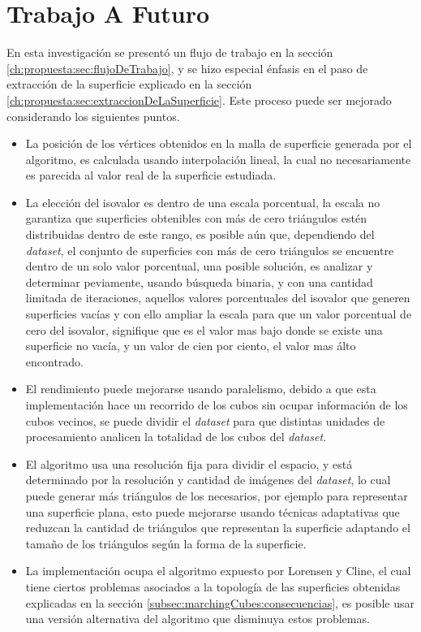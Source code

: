 \chapter{Trabajo A Futuro}
\label{ch:trabajoafuturo}

En esta investigación se presentó un flujo de trabajo en la sección \ref{ch:propuesta:sec:flujoDeTrabajo}, y se hizo especial énfasis en el paso de extracción de la superficie explicado en la sección \ref{ch:propuesta:sec:extraccionDeLaSuperficie}. Este proceso puede ser mejorado considerando los siguientes puntos.

\begin{itemize}
	\item La posición de los vértices obtenidos en la malla de superficie generada por el algoritmo, es calculada usando interpolación lineal, la cual no necesariamente es parecida al valor real de la superficie estudiada.

	\item La elección del isovalor es dentro de una escala porcentual, la escala no garantiza que superficies obtenibles con más de cero triángulos estén distribuidas dentro de este rango, es posible aún que, dependiendo del \emph{dataset}, el conjunto de superficies con más de cero triángulos se encuentre dentro de un solo valor porcentual, una posible solución, es analizar y determinar peviamente, usando búsqueda binaria, y con una cantidad limitada de iteraciones, aquellos valores porcentuales del isovalor que generen superficies vacías y con ello ampliar la escala para que un valor porcentual de cero del isovalor, signifique que es el valor mas bajo donde se existe una superficie no vacía, y un valor de cien por ciento, el valor mas álto encontrado.

	\item El rendimiento puede mejorarse usando paralelismo, debido a que esta implementación hace un recorrido de los cubos sin ocupar información de los cubos vecinos, se puede dividir el \emph{dataset} para que distintas unidades de procesamiento analicen la totalidad de los cubos del \emph{dataset}.

	\item El algoritmo usa una resolución fija para dividir el espacio, y está determinado por la resolución y cantidad de imágenes del \emph{dataset}, lo cual puede generar más triángulos de los necesarios, por ejemplo para representar una superficie plana, esto puede mejorarse usando técnicas adaptativas\cite{Shu95adaptivemarching} que reduzcan la cantidad de triángulos que representan la superficie adaptando el tamaño de los triángulos según la forma de la superficie.

	\item La implementación ocupa el algoritmo expuesto por Lorensen y Cline\cite{Lorensen87marchingcubes}, el cual tiene ciertos problemas asociados a la topología de las superficies obtenidas explicadas en la sección \ref{subsec:marchingCubes:consecuencias}, es posible usar una versión alternativa del algoritmo que disminuya estos problemas\cite{Bloomenthal88polygonizationof}\cite{Chernyaev95marchingcubes}\cite{BAPayne90surfacemapping}\cite{Shu95adaptivemarching}.
\end{itemize}